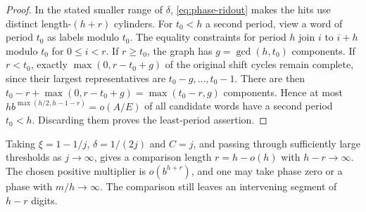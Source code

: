 \begin{proof}
In the stated smaller range of \(\delta\),
\eqref{eq:phase-ridout} makes the hits use distinct
length-\((h+r)\) cylinders. For \(t_0<h\) a second period,
view a word of period \(t_0\) as labels modulo \(t_0\).
The equality constraints for period \(h\) join \(i\) to \(i+h\)
modulo \(t_0\) for \(0\le i<r\).
If \(r\ge t_0\), the graph has \(g=\gcd(h,t_0)\) components.
If \(r<t_0\), exactly \(\max(0,r-t_0+g)\) of the original shift
cycles remain complete, since their largest representatives are
\(t_0-g,\ldots,t_0-1\). There are then
\(t_0-r+\max(0,r-t_0+g)=\max(t_0-r,g)\) components.
Hence at most \(h b^{\max(h/2,h-1-r)}=o(A/E)\)
of all candidate words have a second period \(t_0<h\).
Discarding them proves the least-period assertion.
\end{proof}

Taking \(\xi=1-1/j\), \(\delta=1/(2j)\) and \(C=j\), and passing
through sufficiently large thresholds as \(j\to\infty\), gives
a comparison length \(r=h-o(h)\) with \(h-r\to\infty\).
The chosen positive multiplier is \(o(b^{h+r})\), and one
may take phase zero or a phase with \(m/h\to\infty\).
The comparison still leaves an intervening segment of \(h-r\)
digits.


